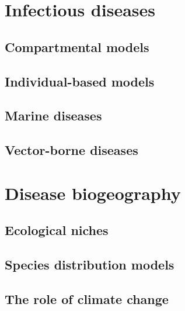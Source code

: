 \section{\label{sec:Infectious diseases} Infectious
  diseases}

\subsection{\label{sec:Compartmental models} Compartmental models}

\subsection{\label{sec:Individual-based models} Individual-based models}

\subsection{\label{sec:Marine diseases} Marine diseases}

\subsection{\label{sec:Vector-borne diseases} Vector-borne diseases}

\section{\label{sec:Disease biogeography} Disease biogeography}

\subsection{\label{sec:Ecological niches} Ecological niches}


\subsection{\label{sec:Species distribution models} Species distribution
  models}




\subsection{\label{sec:The role of climate change} The role of climate change}

